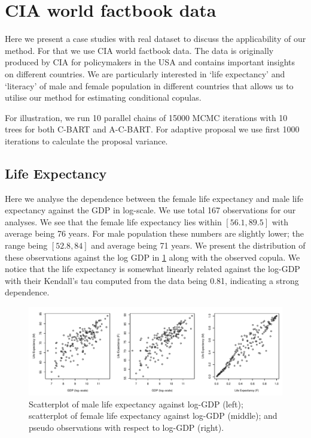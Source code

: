 \documentclass{amsart}
\begin{document}
\section{CIA world factbook data}\label{sec:cia}
Here we present a case studies with real dataset to discuss the applicability of our method. For that we use CIA world factbook data. The data is originally produced by CIA for policymakers in the USA and contains important insights on different countries. We are particularly interested in `life expectancy' and `literacy' of male and female population in different countries that allows us to utilise our method for estimating conditional copulas. 

For illustration, we run 10 parallel chains of 15000 MCMC iterations with 10 trees for both C-BART and A-C-BART. For adaptive proposal we use first 1000 iterations to calculate the proposal variance.

\subsection{Life Expectancy}
Here we analyse the dependence between the female life expectancy and male life expectancy against the GDP in log-scale. We use total 167 observations for our analyses. We see that the female life expectancy lies within $[56.1,89.5]$ with average being 76 years. For male population these numbers are slightly lower; the range being $[52.8, 84]$ and average being 71 years. We present the distribution of these observations against the log GDP in \cref{fig:data:dist:LE} along with the observed copula. We notice that the life expectancy is somewhat linearly related against the log-GDP with their Kendall's tau computed from the data being 0.81, indicating a strong dependence. 
\begin{figure}
	\centering
	\includegraphics[width = 0.95\linewidth]{"cia_LE_plots.pdf"}
	\caption{Scatterplot of male life expectancy against log-GDP (left); scatterplot of female life expectancy against log-GDP (middle); and pseudo observations with respect to log-GDP (right).}
	\label{fig:data:dist:LE}
\end{figure}
\end{document}
